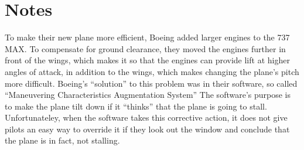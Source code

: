 \documentclass[letterpaper]{article}
\begin{document}
	\section{Notes}
	To make their new plane more efficient, Boeing added larger engines to the 737 MAX. 
	To compensate for ground clearance, they moved the engines further in front of the wings,
	which makes it so that the engines can provide lift at higher angles of attack, in addition to the wings, which makes
	changing the plane's pitch more difficult. Boeing's ``solution'' to this problem was in their software, 
	so called “Maneuvering Characteristics Augmentation System”\cite{ieeespectrum}
	The software's purpose is to make the plane tilt down if it ``thinks'' that the plane is going to stall. 
	Unfortunateley, when the software takes this corrective action, it does not give pilots an easy way to override it if
	they look out the window and conclude that the plane is in fact, not stalling. 



\nocite{*}
\printbibliography
\end{document}

